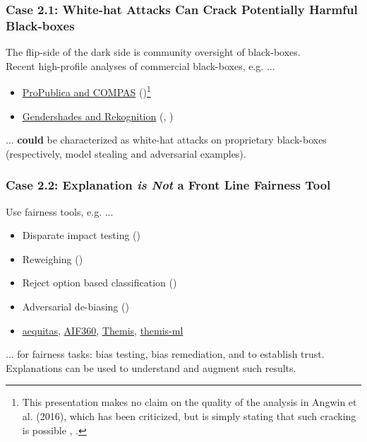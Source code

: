 \documentclass[11pt,aspectratio=169,hyperref={colorlinks}]{beamer}
\begin{document}
	\begin{frame}
	
		\frametitle{\large{\textbf{Case 2.1}: White-hat Attacks Can Crack Potentially Harmful Black-boxes}}
		\large
		The flip-side of the dark side is community oversight of black-boxes.\\
		\vspace{10pt}
		Recent high-profile analyses of commercial black-boxes, e.g. ... 
		\begin{itemize}		
			\item \href{https://www.propublica.org/article/machine-bias-risk-assessments-in-criminal-sentencing}{ProPublica and COMPAS} (\citet{angwin16})\footnote{\tiny{This presentation makes no claim on the quality of the analysis in Angwin et al. (2016), which has been criticized, but is simply stating that such cracking is possible \cite{angwin16,}, \cite{flores2016false}}.}
			\item \href{https://medium.com/@Joy.Buolamwini/response-racial-and-gender-bias-in-amazon-rekognition-commercial-ai-system-for-analyzing-faces-a289222eeced}{Gendershades and Rekognition} (\citet{gender_shades}, \citet{raji2019actionable})
		\end{itemize}
		... \textbf{could} be characterized as white-hat attacks on proprietary black-boxes (respectively, model stealing and adversarial examples).

	\end{frame}
	
	\begin{frame}[label={not_frontline}]
	
		\frametitle{\textbf{Case 2.2}: Explanation \textbf{\textit{is Not}} a Front Line Fairness Tool}
		\large
		Use fairness tools, e.g. ...
		\vspace{5pt}
		\begin{itemize}\normalsize
			\item Disparate impact testing (\citet{feldman2015certifying})
			\item Reweighing (\citet{kamiran2012data})
			\item Reject option based classification (\citet{kamiran2012decision})
			\item Adversarial de-biasing (\citet{zhang2018mitigating})
			\item \href{https://github.com/dssg/aequitas}{aequitas}, \href{https://github.com/IBM/AIF360}{AIF360}, \href{https://github.com/LASER-UMASS/Themis}{Themis}, \href{https://github.com/cosmicBboy/themis-ml}{themis-ml}
		\end{itemize}
		\vspace{5pt}
		... for fairness tasks: bias testing, bias remediation, and to establish trust.\\
		\vspace{10pt}
		Explanations can be used to understand and augment such results.
		
	\end{frame}
	
\end{document}
